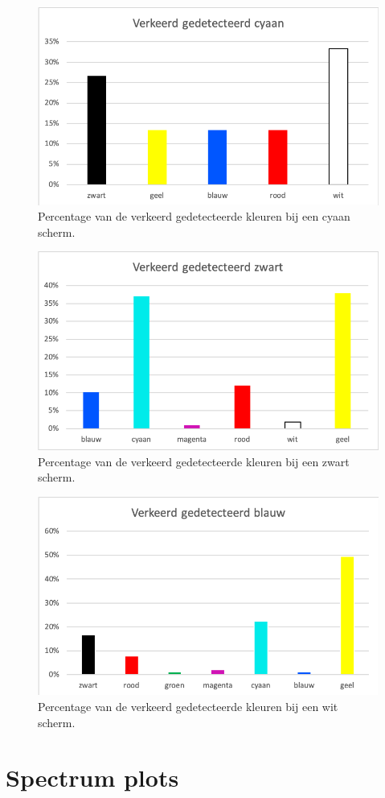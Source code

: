 \documentclass[a4paper,11pt]{article}
\begin{document}
		\bigskip	
		\begin{figure} [H]
			\center
			\includegraphics{img/WrongBlueGreen}
			\caption{Percentage van de verkeerd gedetecteerde kleuren bij een cyaan scherm.}
		\end{figure}
	\bigskip		
		\begin{figure} [H]
			\center
			\includegraphics{img/WrongBlack}
			\caption{Percentage van de verkeerd gedetecteerde kleuren bij een zwart scherm.}
		\end{figure}
	\bigskip		
		\begin{figure} [H]
			\center
			\includegraphics{img/WrongWhite}
			\caption{Percentage van de verkeerd gedetecteerde kleuren bij een wit scherm.}
		\end{figure}
\section{Spectrum plots}

\end{document}
